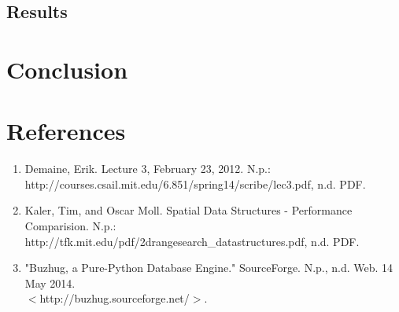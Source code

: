 \documentclass[11pt, oneside]{article}
\begin{document}
\subsection{Results}


\section{Conclusion}




\section{References}

\begin{enumerate}[1.]
\item Demaine, Erik. Lecture 3, February 23, 2012. N.p.: \\ http://courses.csail.mit.edu/6.851/spring14/scribe/lec3.pdf, n.d. PDF.

\item Kaler, Tim, and Oscar Moll. Spatial Data Structures - Performance Comparision. N.p.: \\ http://tfk.mit.edu/pdf/2drangesearch\_datastructures.pdf, n.d. PDF.

\item "Buzhug, a Pure-Python Database Engine." SourceForge. N.p., n.d. Web. 14 May 2014. \\ $<$http://buzhug.sourceforge.net/$>$.


\end{enumerate}
\end{document}
